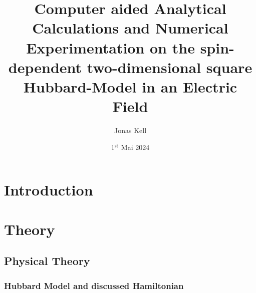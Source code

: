 \documentclass[
headings=optiontohead,              %
12pt,                               %
DIV=13,                             %
twoside=false,                      %
open=right,                         %
BCOR=00mm,                          %
toc=bibliographynumbered            %
]{scrreport}
\title{Computer aided Analytical Calculations and Numerical Experimentation on the spin-dependent two-dimensional square Hubbard-Model in an Electric Field}
\author{Jonas Kell}
\date{1$^\text{st}$ Mai 2024} %
\begin{document}
\thispagestyle{empty}                           %
\cleardoublepage                                %
\pagestyle{scrheadings}                         %
\renewcommand{\contentsname}{Table of Contents} %
\tableofcontents                                %
\cleardoublepage                                %

\clearpairofpagestyles
\ihead{\leftmark}
\ohead{\Ifstr{\leftmark}{\rightmark}{}{\rightmark}}
\cfoot*{\pagemark}


\chapter{Introduction}
\label{sec:introduction}

\FloatBarrier

\chapter{Theory}
\label{sec:theory}

    \section{Physical Theory}
    \label{sec:theory-physics}
    
    \FloatBarrier
    
        \subsection{Hubbard Model and discussed Hamiltonian}
        \label{sec:theory-hubbard-hamiltonian}
        
        \FloatBarrier
        
\end{document}

